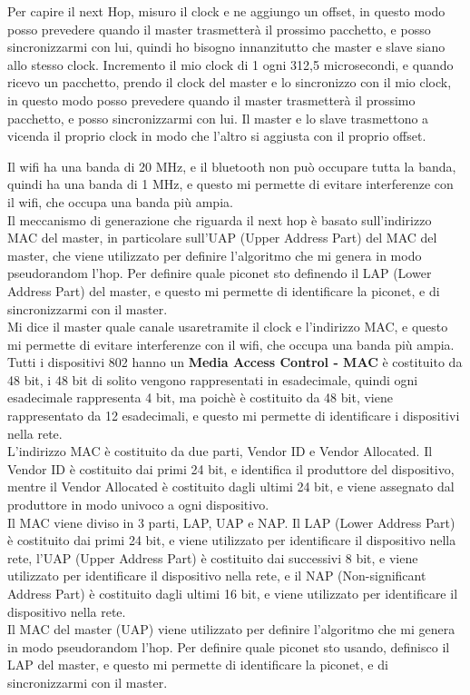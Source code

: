 Per capire il next Hop, misuro il clock e ne aggiungo un offset, in questo modo posso prevedere quando il master trasmetterà il prossimo pacchetto, e posso sincronizzarmi con lui, quindi ho bisogno innanzitutto che master e slave siano allo stesso clock. Incremento il mio clock di 1 ogni 312,5 microsecondi, e quando ricevo un pacchetto, prendo il clock del master e lo sincronizzo con il mio clock, in questo modo posso prevedere quando il master trasmetterà il prossimo pacchetto, e posso sincronizzarmi con lui. Il master e lo slave trasmettono a vicenda il proprio clock in modo che l'altro si aggiusta con il proprio offset. 

Il wifi ha una banda di 20 MHz, e il bluetooth non può occupare tutta la banda, quindi ha una banda di 1 MHz, e questo mi permette di evitare interferenze con il wifi, che occupa una banda più ampia.\\

Il meccanismo di generazione che riguarda il next hop è basato sull'indirizzo MAC del master, in particolare sull'UAP (Upper Address Part) del MAC del master, che viene utilizzato per definire l'algoritmo che mi genera in modo pseudorandom l'hop. Per definire quale piconet sto definendo il LAP (Lower Address Part) del master, e questo mi permette di identificare la piconet, e di sincronizzarmi con il master.\\
Mi dice il master quale canale usaretramite il clock e l'indirizzo MAC, e questo mi permette di evitare interferenze con il wifi, che occupa una banda più ampia.\\

Tutti i dispositivi 802 hanno un \textbf{Media Access Control - MAC} è costituito da 48 bit, i 48 bit di solito vengono rappresentati in esadecimale, quindi ogni esadecimale rappresenta 4 bit, ma poichè è costituito da 48 bit, viene rappresentato da 12 esadecimali, e questo mi permette di identificare i dispositivi nella rete.\\
L'indirizzo MAC è costituito da due parti, Vendor ID e Vendor Allocated. Il Vendor ID è costituito dai primi 24 bit, e identifica il produttore del dispositivo, mentre il Vendor Allocated è costituito dagli ultimi 24 bit, e viene assegnato dal produttore in modo univoco a ogni dispositivo.\\
Il MAC viene diviso in 3 parti, LAP, UAP e NAP. Il LAP (Lower Address Part) è costituito dai primi 24 bit, e viene utilizzato per identificare il dispositivo nella rete, l'UAP (Upper Address Part) è costituito dai successivi 8 bit, e viene utilizzato per identificare il dispositivo nella rete, e il NAP (Non-significant Address Part) è costituito dagli ultimi 16 bit, e viene utilizzato per identificare il dispositivo nella rete.\\
Il MAC del master (UAP) viene utilizzato per definire l'algoritmo che mi genera in modo pseudorandom l'hop. Per definire quale piconet sto usando, definisco il LAP del master, e questo mi permette di identificare la piconet, e di sincronizzarmi con il master.\\

